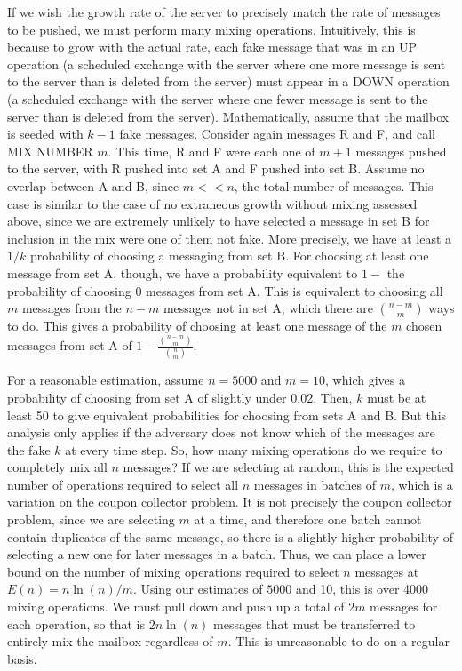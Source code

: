 \documentclass[pageno]{jpaper}
\begin{document}
If we wish the growth rate of the server to precisely match the rate of messages to be pushed, we must perform many mixing operations. Intuitively, this is because to grow with the actual rate, each fake message that was in an UP operation (a scheduled exchange with the server where one more message is sent to the server than is deleted from the server) must appear in a DOWN operation (a scheduled exchange with the server where one fewer message is sent to the server than is deleted from the server). Mathematically, assume that the mailbox is seeded with $k-1$ fake messages. Consider again messages R and F, and call MIX NUMBER $m$. This time, R and F were each one of $m + 1$ messages pushed to the server, with R pushed into set A and F pushed into set B. Assume no overlap between A and B, since $m<<n$, the total number of messages. This case is similar to the case of no extraneous growth without mixing assessed above, since we are extremely unlikely to have selected a message in set B for inclusion in the mix were one of them not fake. More precisely, we have at least a $1/k$ probability of choosing a messaging from set B. For choosing at least one message from set A, though, we have a probability equivalent to $1-$ the probability of choosing 0 messages from set A. This is equivalent to choosing all $m$ messages from the $n-m$ messages not in set A, which there are ${{n-m}\choose m}$ ways to do. This gives a probability of choosing at least one message of the $m$ chosen messages from set A of $1-\frac{{{n-m}\choose m}}{{n \choose m}}$.

For a reasonable estimation, assume $n=5000$ and $m=10$, which gives a probability of choosing from set A of slightly under 0.02. Then, $k$ must be at least 50 to give equivalent probabilities for choosing from sets A and B. But this analysis only applies if the adversary does not know which of the messages are the fake $k$ at every time step. So, how many mixing operations do we require to completely mix all $n$ messages? If we are selecting at random, this is the expected number of operations required to select all $n$ messages in batches of $m$, which is a variation on the coupon collector problem. It is not precisely the coupon collector problem, since we are selecting $m$ at a time, and therefore one batch cannot contain duplicates of the same message, so there is a slightly higher probability of selecting a new one for later messages in a batch. Thus, we can place a lower bound on the number of mixing operations required to select $n$ messages at $E(n) = n \ln (n) / m$. Using our estimates of $5000$ and 10, this is over 4000 mixing operations. We must pull down and push up a total of $2m$ messages for each operation, so that is $2n\ln (n)$ messages that must be transferred to entirely mix the mailbox regardless of $m$. This is unreasonable to do on a regular basis.
\end{document}
